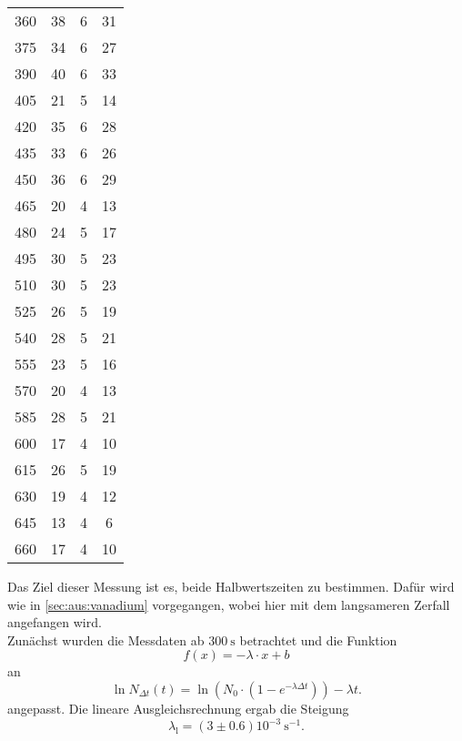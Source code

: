 \begin{longtable}{c c c c}
		360  	&  38  	&  6         	&  31 \\
		375  	&  34  	&  6         	&  27 \\
		390  	&  40  	&  6         	&  33 \\
		405  	&  21  	&  5         	&  14 \\
		420  	&  35  	&  6         	&  28 \\
		435  	&  33  	&  6         	&  26 \\
		450  	&  36  	&  6         	&  29 \\
		465  	&  20  	&  4         	&  13 \\
		480  	&  24  	&  5         	&  17 \\
		495  	&  30  	&  5         	&  23 \\
		510  	&  30  	&  5         	&  23 \\
		525  	&  26  	&  5         	&  19 \\
		540  	&  28  	&  5         	&  21 \\
		555  	&  23  	&  5         	&  16 \\
		570  	&  20  	&  4         	&  13 \\
		585  	&  28  	&  5         	&  21 \\
		600  	&  17  	&  4         	&  10 \\
		615  	&  26  	&  5         	&  19 \\
		630  	&  19  	&  4         	&  12 \\
		645  	&  13  	&  4         	&   6 \\
		660  	&  17  	&  4         	&  10 \\
\end{longtable}
\noindent
Das Ziel dieser Messung ist es, beide Halbwertszeiten zu bestimmen. Dafür wird wie in \autoref{sec:aus:vanadium}
vorgegangen, wobei hier mit dem langsameren Zerfall angefangen wird.
\\
Zunächst wurden die Messdaten ab $\SI{300}{\second}$ betrachtet und die Funktion
\begin{equation}
	f(x) = -\lambda \cdot x + b
	\label{eqn:mx+b2}
\end{equation}
\noindent
an 
\begin{equation}
	\ln N_{\Delta t}(t) = \ln(N_0 \cdot (1 - e^{-\lambda \Delta t})) - \lambda t.
	\label{eqn:logarithmisch2}
\end{equation}
angepasst.
Die lineare Ausgleichsrechnung ergab die Steigung
\begin{equation}
	\lambda_\text{l} = (3 \pm 0.6) 10^{-3}\ \si{\second}^{-1}.
\end{equation}
